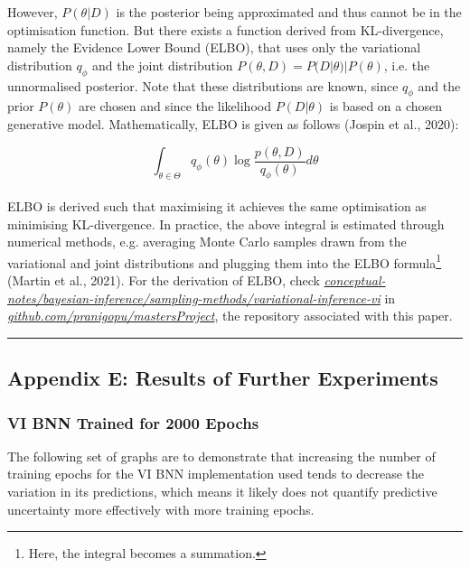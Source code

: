 \documentclass[conference]{IEEEtran}
\begin{document}
However, $P(\theta|D)$ is the posterior being approximated and thus cannot be in the optimisation function. But there exists a function derived from KL-divergence, namely the Evidence Lower Bound (ELBO), that uses only the variational distribution $q_\phi$ and the joint distribution $P(\theta, D) = P(D|\theta)|P(\theta)$, i.e. the unnormalised posterior. Note that these distributions are known, since $q_\phi$ and the prior $P(\theta)$ are chosen and since the likelihood $P(D|\theta)$ is based on a chosen generative model. Mathematically, ELBO is given as follows (Jospin et al., 2020):

\begin{equation*}
	\int_{\theta \in \Theta} q_\phi(\theta) \log \frac{p(\theta, D)}{q_\phi(\theta)} d\theta
\end{equation*}\\

ELBO is derived such that maximising it achieves the same optimisation as minimising KL-divergence. In practice, the above integral is estimated through numerical methods, e.g. averaging Monte Carlo samples drawn from the variational and joint distributions and plugging them into the ELBO formula\footnote{Here, the integral becomes a summation.} (Martin et al., 2021). For the derivation of ELBO, check \href{https://github.com/pranigopu/mastersProject/tree/main/conceptual-notes/bayesian-inference/sampling-methods/variational-inference-vi}{\textit{conceptual-notes/bayesian-inference/sampling-methods/variational-inference-vi}} in \href{https://github.com/pranigopu/mastersProject}{\textit{github.com/pranigopu/mastersProject}}, the repository associated with this paper.

\par\noindent\rule{0.49\textwidth}{0.1pt}

\subsection*{Appendix E: Results of Further Experiments}
\subsubsection{VI BNN Trained for 2000 Epochs}
The following set of graphs are to demonstrate that increasing the number of training epochs for the VI BNN implementation used tends to decrease the variation in its predictions, which means it likely does not quantify predictive uncertainty more effectively with more training epochs.
\end{document}
